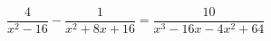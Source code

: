 \begin{ex}[type=equation]
	\begin{condition}
		$\dfrac{4}{x^2 - 16} - \dfrac{1}{x^2 +  8x + 16} = \dfrac{10}{x^3 - 16x - 4x^2 + 64}$
	\end{condition}
\end{ex}
